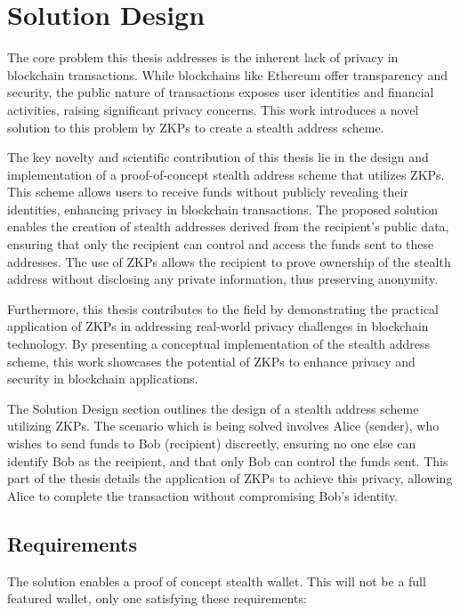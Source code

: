 \chapter{Solution Design}\label{chapter:solution}

The core problem this thesis addresses is the inherent lack of privacy in
blockchain transactions. While blockchains like Ethereum offer transparency
and security, the public nature of transactions exposes user identities and
financial activities, raising significant privacy concerns. This work
introduces a novel solution to this problem by ZKPs to create a stealth
address scheme.

The key novelty and scientific contribution of this thesis lie in the design
and implementation of a proof-of-concept stealth address scheme that utilizes
ZKPs. This scheme allows users to receive funds without publicly revealing
their identities, enhancing privacy in blockchain transactions. The proposed
solution enables the creation of stealth addresses derived from the
recipient's public data, ensuring that only the recipient can control and
access the funds sent to these addresses. The use of ZKPs allows the recipient
to prove ownership of the stealth address without disclosing any private
information, thus preserving anonymity.

Furthermore, this thesis contributes to the field by demonstrating the
practical application of ZKPs in addressing real-world privacy challenges in
blockchain technology. By presenting a conceptual implementation of the
stealth address scheme, this work showcases the potential of ZKPs to enhance
privacy and security in blockchain applications.

The Solution Design section outlines the design of a stealth address
scheme utilizing ZKPs. The scenario which is being solved involves Alice
(sender), who wishes to send funds to Bob (recipient)
discreetly, ensuring no one else can identify Bob as the recipient, and that
only Bob can control the funds sent. This part of the
thesis details the application of ZKPs to achieve this privacy,
allowing Alice to complete the transaction without compromising Bob's identity.

\section{Requirements}

The solution enables a proof of concept stealth wallet. This will not be a
full featured wallet, only one satisfying these requirements:

